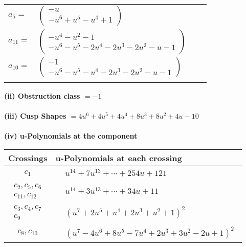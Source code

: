 \documentclass[1p]{elsarticle_modified}
\theoremstyle{definition}
\begin{document}
\begin{tabular}{m{7pt} m{180pt} m{7pt} m{180pt} }
\flushright $a_{5}=$&$\begin{pmatrix}- u\\- u^6+u^5- u^4+1\end{pmatrix}$ \\
\flushright $a_{11}=$&$\begin{pmatrix}- u^4- u^2-1\\- u^6- u^5-2 u^4-2 u^3-2 u^2- u-1\end{pmatrix}$ \\
\flushright $a_{10}=$&$\begin{pmatrix}-1\\- u^6- u^5- u^4-2 u^3-2 u^2- u-1\end{pmatrix}$\\&\end{tabular}
\flushleft \textbf{(ii) Obstruction class $= -1$}\\~\\
\flushleft \textbf{(iii) Cusp Shapes $= 4 u^6+4 u^5+4 u^4+8 u^3+8 u^2+4 u-10$}\\~\\
\newpage\renewcommand{\arraystretch}{1}
\flushleft \textbf{(iv) u-Polynomials at the component}\newline \\
\begin{tabular}{m{50pt}|m{274pt}}
Crossings & \hspace{64pt}u-Polynomials at each crossing \\
\hline $$\begin{aligned}c_{1}\end{aligned}$$&$\begin{aligned}
&u^{14}+7 u^{13}+\cdots+254 u+121
\end{aligned}$\\
\hline $$\begin{aligned}c_{2},c_{5},c_{6}\\c_{11},c_{12}\end{aligned}$$&$\begin{aligned}
&u^{14}+3 u^{13}+\cdots+34 u+11
\end{aligned}$\\
\hline $$\begin{aligned}c_{3},c_{4},c_{7}\\c_{9}\end{aligned}$$&$\begin{aligned}
&(u^7+2 u^5+u^4+2 u^3+u^2+1)^2
\end{aligned}$\\
\hline $$\begin{aligned}c_{8},c_{10}\end{aligned}$$&$\begin{aligned}
&(u^7-4 u^6+8 u^5-7 u^4+2 u^3+3 u^2-2 u+1)^2
\end{aligned}$\\
\hline
\end{tabular}\\~\\
\end{document}

